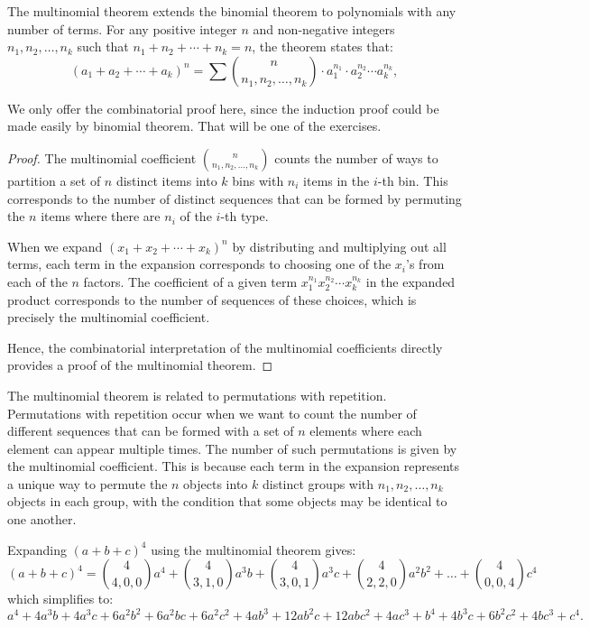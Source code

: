         \begin{definition}
            The multinomial theorem extends the binomial theorem to polynomials with any number of terms. For any positive integer $n$ and non-negative integers $n_1, n_2, \ldots, n_k$ such that $n_1 + n_2 + \cdots + n_k = n$, the theorem states that:
            \[
            (a_1 + a_2 + \cdots + a_k)^n = \sum \binom{n}{n_1, n_2, \ldots, n_k} \cdot a_1^{n_1} \cdot a_2^{n_2} \cdots a_k^{n_k},
            \]
        \end{definition}
        We only offer the combinatorial proof here, since the induction proof could be made easily by binomial
        theorem. That will be one of the exercises.
        \begin{proof}
            The multinomial coefficient $\binom{n}{n_1, n_2, \ldots, n_k}$ counts the number of ways to partition a set of $n$ distinct items into $k$ bins with $n_i$ items in the $i$-th bin. This corresponds to the number of distinct sequences that can be formed by permuting the $n$ items where there are $n_i$ of the $i$-th type.

            When we expand $(x_1 + x_2 + \cdots + x_k)^n$ by distributing and multiplying out all terms, each term in the expansion corresponds to choosing one of the $x_i$'s from each of the $n$ factors. The coefficient of a given term $x_1^{n_1} x_2^{n_2} \cdots x_k^{n_k}$ in the expanded product corresponds to the number of sequences of these choices, which is precisely the multinomial coefficient.

            Hence, the combinatorial interpretation of the multinomial coefficients directly provides a proof of the multinomial theorem.

        \end{proof}    
        The multinomial theorem is related to permutations with repetition. Permutations with repetition occur when we want to count the number of different sequences that can be formed with a set of $n$ elements where each element can appear multiple times. The number of such permutations is given by the multinomial coefficient. This is because each term in the expansion represents a unique way to permute the $n$ objects into $k$ distinct groups with $n_1, n_2, \ldots, n_k$ objects in each group, with the condition that some objects may be identical to one another.
        
        \begin{example}
            Expanding $(a + b + c)^4$ using the multinomial theorem gives:
            \[
            (a + b + c)^4 = \binom{4}{4,0,0}a^4 + \binom{4}{3,1,0}a^3b + \binom{4}{3,0,1}a^3c + \binom{4}{2,2,0}a^2b^2 + \ldots + \binom{4}{0,0,4}c^4
            \]
            which simplifies to:
            $
            a^4 + 4a^3b + 4a^3c + 6a^2b^2 + 6a^2bc + 6a^2c^2 + 4ab^3 + 12ab^2c + 12abc^2 + 4ac^3 + b^4 + 4b^3c + 6b^2c^2 + 4bc^3 + c^4.
            $
        \end{example}
            
